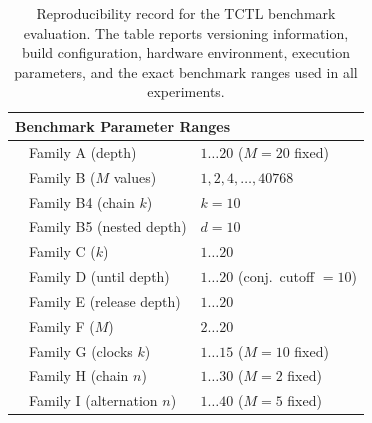 \begin{table}[t]
\begin{tabular}{@{}lll@{}}
\midrule
\multicolumn{3}{l}{\textbf{Benchmark Parameter Ranges}} \\
\midrule
 & Family A (depth) & $1 \ldots 20$ ($M=20$ fixed) \\
 & Family B ($M$ values) & $1,2,4,\ldots,40768$ \\
 & Family B4 (chain $k$) & $k=10$ \\
 & Family B5 (nested depth) & $d=10$ \\
 & Family C ($k$) & $1 \ldots 20$ \\
 & Family D (until depth) & $1 \ldots 20$ (conj.\ cutoff $=10$) \\
 & Family E (release depth) & $1 \ldots 20$ \\
 & Family F ($M$) & $2 \ldots 20$ \\
 & Family G (clocks $k$) & $1 \ldots 15$ ($M=10$ fixed) \\
 & Family H (chain $n$) & $1 \ldots 30$ ($M=2$ fixed) \\
 & Family I (alternation $n$) & $1 \ldots 40$ ($M=5$ fixed) \\

\bottomrule
\end{tabular}
\caption{Reproducibility record for the TCTL benchmark evaluation. The table reports versioning information, build configuration, hardware environment, execution parameters, and the exact benchmark ranges used in all experiments.}
\label{tab:reproducibility}
\end{table}